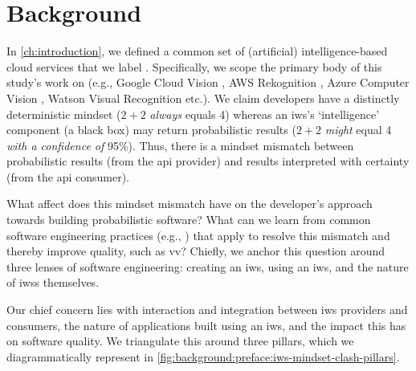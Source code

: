 \chapter{Background}
\label{ch:background}

\graphicspath{{mainmatter/background/figures/}}

\label{sec:background:preface}

In \cref{ch:introduction}, we defined a common set of (artificial) intelligence-based cloud services that we label . Specifically, we scope the primary body of this study's work on  (e.g., Google Cloud Vision \citep{GoogleCloud:Home}, AWS Rekognition \citep{AWS:Home}, Azure Computer Vision \citep{Azure:Home}, Watson Visual Recognition \citep{IBM:Home} etc.). We claim developers have a distinctly deterministic mindset ($2+2$ \textit{always}  equals 4) whereas an \gls{iws}'s `intelligence' component (a black box) may return probabilistic results ($2+2$ \textit{might} equal 4 \textit{with a confidence of} 95\%). Thus, there is a mindset mismatch between probabilistic results (from the \gls{api} provider) and results interpreted with certainty (from the \gls{api} consumer).

What affect does this mindset mismatch have on the developer's approach towards building probabilistic software? What can we learn from common software engineering practices (e.g., \citep{Pressman:2005vf,Sommerville:2011uc}) that apply to resolve this mismatch and thereby improve quality, such as \gls{vv}? Chiefly, we anchor this question around three lenses of software engineering: creating an \gls{iws}, using an \gls{iws}, and the nature of \glspl{iws} themselves.

Our chief concern lies with interaction and integration between \gls{iws} providers and consumers, the nature of applications built using an \gls{iws}, and the impact this has on software quality. We triangulate this around three pillars, which we diagrammatically represent in \cref{fig:background:preface:iws-mindset-clash-pillars}.
 
